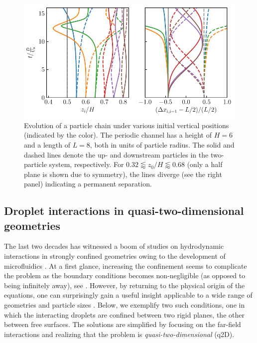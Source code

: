 \begin{figure}%
  \centering
  \includegraphics[width=0.9\columnwidth]{H3.pdf}
  \caption{Evolution of a particle chain under various initial vertical positions (indicated by the color). The periodic channel has a height of $H=6$ and a length of $L=8$, both in units of particle radius. The solid and dashed lines denote the up- and downstream particles in the two-particle system, respectively. For $0.32 \lessapprox z_0/H \lessapprox 0.68$ (only a half plane is shown due to symmetry), the lines diverge (see the right panel) indicating a permanent separation.}
  \label{fig:xover}
\end{figure}



\subsection{Droplet interactions in quasi-two-dimensional geometries}
\label{subsec:drop-confined}

The last two decades has witnessed a boom of studies on hydrodynamic interactions in strongly confined geometries owing to the development of microfluidics \citep{Cui_etal_2002, Cui2004, tlusty, Davit_2008, q2d_Beatus}. At a first glance, increasing the confinement seems to complicate the problem as the boundary conditions becomes non-negligible (as opposed to being infinitely away), see \eg \cite{LironMochon, Fouxon_Rubinstein2019}. However, by returning to the physical origin of the equations, one can surprisingly gain a useful insight applicable to a wide range of geometries and particle sizes \citep{Diamant_2005}. Below, we exemplify two such conditions, one in which the interacting droplets are confined between two rigid planes, the other between free surfaces. The solutions are simplified by focusing on the far-field interactions and realizing that the problem is \emph{quasi-two-dimensional} (q2D). 


